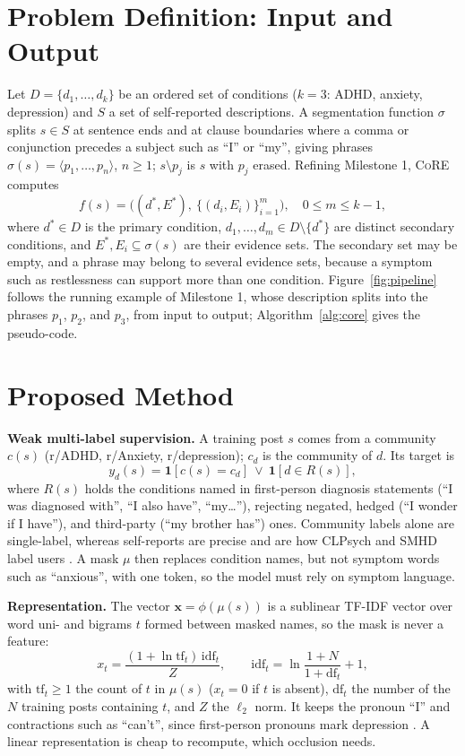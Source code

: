\documentclass[sigconf]{acmart}
\newcommand{\core}{\textsc{CoRE}}
\begin{document}
\section{Problem Definition: Input and Output}
Let $D=\{d_1,\dots,d_k\}$ be an ordered set of conditions ($k=3$: ADHD, anxiety, depression) and $S$ a set of self-reported descriptions. A segmentation function $\sigma$ splits $s\in S$ at sentence ends and at clause boundaries where a comma or conjunction precedes a subject such as ``I'' or ``my'', giving phrases $\sigma(s)=\langle p_1,\dots,p_n\rangle$, $n\ge1$; $s\setminus p_j$ is $s$ with $p_j$ erased. Refining Milestone 1, \core{} computes
\begin{equation}
f(s)=\big((d^{*},E^{*}),\ \{(d_i,E_i)\}_{i=1}^{m}\big),\quad 0\le m\le k-1,
\end{equation}
where $d^{*}\in D$ is the primary condition, $d_1,\dots,d_m\in D\setminus\{d^{*}\}$ are distinct secondary conditions, and $E^{*},E_i\subseteq\sigma(s)$ are their evidence sets. The secondary set may be empty, and a phrase may belong to several evidence sets, because a symptom such as restlessness can support more than one condition. Figure~\ref{fig:pipeline} follows the running example of Milestone 1, whose description splits into the phrases $p_1$, $p_2$, and $p_3$, from input to output; Algorithm~\ref{alg:core} gives the pseudo-code.

\section{Proposed Method}
\textbf{Weak multi-label supervision.} A training post $s$ comes from a community $c(s)$ (r/ADHD, r/Anxiety, r/depression); $c_d$ is the community of $d$. Its target is
\begin{equation}
y_d(s)=\mathbf{1}[c(s)=c_d]\ \lor\ \mathbf{1}[d\in R(s)],
\end{equation}
where $R(s)$ holds the conditions named in first-person diagnosis statements (``I was diagnosed with'', ``I also have'', ``my\dots''), rejecting negated, hedged (``I wonder if I have''), and third-party (``my brother has'') ones. Community labels alone are single-label, whereas self-reports are precise and are how CLPsych and SMHD label users \cite{coppersmith2015clpsych, cohan2018smhd}. A mask $\mu$ then replaces condition names, but not symptom words such as ``anxious'', with one token, so the model must rely on symptom language.

\textbf{Representation.} The vector $\mathbf{x}=\phi(\mu(s))$ is a sublinear TF-IDF vector over word uni- and bigrams $t$ formed between masked names, so the mask is never a feature:
\begin{equation}
x_t=\frac{(1+\ln\mathrm{tf}_{t})\,\mathrm{idf}_t}{Z},\qquad \mathrm{idf}_t=\ln\frac{1+N}{1+\mathrm{df}_t}+1,
\end{equation}
with $\mathrm{tf}_t\ge1$ the count of $t$ in $\mu(s)$ ($x_t=0$ if $t$ is absent), $\mathrm{df}_t$ the number of the $N$ training posts containing $t$, and $Z$ the $\ell_2$ norm. It keeps the pronoun ``I'' and contractions such as ``can't'', since first-person pronouns mark depression \cite{rude2004language}. A linear representation is cheap to recompute, which occlusion needs.
\end{document}
